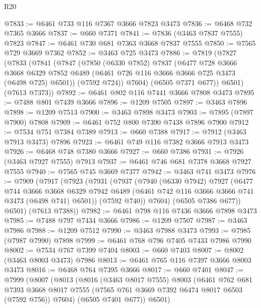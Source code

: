 \begin{lexlean}{R20}
\begin{coremodule}
@7833 := @6461 @733 @116 @7367 @3666 @7823 @3473
@7836 := @6468 @732 @7365 @3666
@7837 := @660 @7371
@7841 := @7836 (@3463 @7837 @7555) @7823
@7847 := @6461 @730 @681 @7363 @3668 @7837 @7555
@7850 := @7565 @729 @3669 @7362
@7852 := @3463 @725 @3473
@7886 := @7819
    (@7827
      (@7833
        (@7841
          (@7847
            (@7850
              (@6330 @7852)
              @7837
              (@6477
                @728
                @3666
                @3668
                @6329
                @7852
                @6489
                (@6461 @726 @116 @3666 @3666 @725 @3473 (@6498 @725) @6501))
              (@7592 @724))
            @7604)
          (@6505 @7371 @677))
        @6501)
      (@7613 @7373))
@7892 := @6461 @802 @116 @7441 @3666 @7808 @3473
@7895 := @7488 @801 @7439 @3666
@7896 := @1209 @7505
@7897 := @3463 @7896
@7898 := @1209 @7513
@7900 := @3463 @7898 @3473
@7903 := @7895 (@7897 @7900) @7808
@7909 := @6461 @752 @800 @7390 @7438 @7896 @7900
@7912 := @7534 @751 @7384 @7389
@7913 := @660 @7388
@7917 := @7912 (@3463 @7913 @3473) @7896
@7923 := @6461 @749 @116 @7382 @3666 @7913 @3473
@7926 := @6468 @748 @7380 @3666
@7927 := @660 @7386
@7931 := @7926 (@3463 @7927 @7555) @7913
@7937 := @6461 @746 @681 @7378 @3668 @7927 @7555
@7940 := @7565 @745 @3669 @7377
@7942 := @3463 @741 @3473
@7976 := @7909
    (@7917
      (@7923
        (@7931
          (@7937
            (@7940
              (@6330 @7942)
              @7927
              (@6477
                @744
                @3666
                @3668
                @6329
                @7942
                @6489
                (@6461 @742 @116 @3666 @3666 @741 @3473 (@6498 @741) @6501))
              (@7592 @740))
            @7604)
          (@6505 @7386 @677))
        @6501)
      (@7613 @7388))
@7982 := @6461 @798 @116 @7436 @3666 @7898 @3473
@7985 := @7488 @797 @7434 @3666
@7986 := @1209 @7507
@7987 := @3463 @7986
@7988 := @1209 @7512
@7990 := @3463 @7988 @3473
@7993 := @7985 (@7987 @7990) @7898
@7999 := @6461 @768 @796 @7405 @7433 @7986 @7990
@8002 := @7534 @767 @7399 @7404
@8003 := @660 @7403
@8007 := @8002 (@3463 @8003 @3473) @7986
@8013 := @6461 @765 @116 @7397 @3666 @8003 @3473
@8016 := @6468 @764 @7395 @3666
@8017 := @660 @7401
@8047 := @7999
    (@8007
      (@8013
        (@8016
          (@3463 @8017 @7555)
          @8003
          (@6461
            @762
            @681
            @7393
            @3668
            @8017
            @7555
            (@7565 @761 @3669 @7392 @6474 @8017 @6503 (@7592 @756))
            @7604)
          (@6505 @7401 @677))
        @6501)

\end{coremodule}
\end{lexlean}
